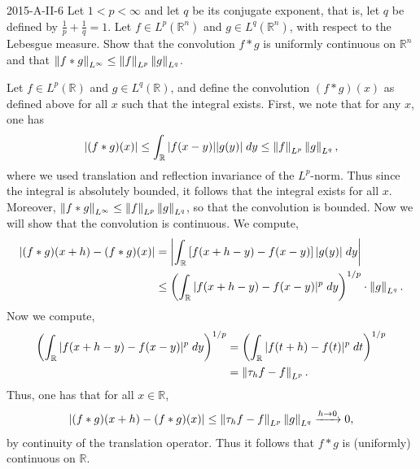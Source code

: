 \documentclass{article}
\begin{document}
	\begin{prb}{2015-A-II-6}
		Let $1 < p < \infty$ and let $q$ be its conjugate exponent, that is, let $q$ be defined by $\frac{1}{p} + \frac{1}{q} = 1$. Let $f \in L^p(\mathbb{R}^n)$ and $g \in L^q(\mathbb{R}^n)$, with respect to the Lebesgue measure. Show that the convolution $f \ast g$ is uniformly continuous on $\mathbb{R}^n$ and that $\left\Vert f \ast g \right\Vert_{L^\infty} \leq \left\Vert f \right\Vert_{L^p}\left\Vert g \right\Vert_{L^q}$. 
	\end{prb}
	Let $f \in L^p(\mathbb{R})$ and $g \in L^q(\mathbb{R})$, and define the convolution $(f \ast g)(x)$ as defined above for all $x$ such that the integral exists. First, we note that for any $x$, one has 
	\begin{equation*}
		\left| (f \ast g)(x) \right| \leq \int_{\mathbb{R}}|f(x-y)||g(y)|\;dy \leq \left\Vert f \right\Vert_{L^p}\left\Vert g \right\Vert_{L^q}, 
	\end{equation*}
	where we used translation and reflection invariance of the $L^p$-norm. Thus since the integral is absolutely bounded, it follows that the integral exists for all $x$. Moreover, $\left\Vert f \ast g \right\Vert_{L^\infty} \leq \left\Vert f \right\Vert_{L^p}\left\Vert g \right\Vert_{L^q}$, so that the convolution is bounded. Now we will show that the convolution is continuous. We compute, 
	\begin{align*}
		\begin{split}
			|(f \ast g)(x + h) - (f \ast g)(x)| &= \left| \int_{\mathbb{R}}\left[f(x + h - y) - f(x - y)\right]|g(y)|\;dy \right| \\
			&\leq \left(\int_{\mathbb{R}}|f(x + h - y) - f(x - y)|^{p}\;dy\right)^{1/p} \cdot \left\Vert g \right\Vert_{L^q}. 
		\end{split}
	\end{align*}
	Now we compute, 
	\begin{align*}
		\begin{split}
			\left(\int_{\mathbb{R}}|f(x + h - y) - f(x - y)|^{p}\;dy\right)^{1/p} &= \left(\int_{\mathbb{R}}|f(t + h) - f(t)|^p\;dt\right)^{1/p} \\
			&= \left\Vert \tau_hf - f \right\Vert_{L^p}. 
		\end{split}
	\end{align*}
	Thus, one has that for all $x \in \mathbb{R}$, 
	\begin{equation*}
		|(f \ast g)(x + h) - (f \ast g)(x)| \leq \left\Vert \tau_hf - f \right\Vert_{L^p}\left\Vert g \right\Vert_{L^q} \xrightarrow{h \to 0} 0, 
	\end{equation*}
	by continuity of the translation operator. Thus it follows that $f \ast g$ is (uniformly) continuous on $\mathbb{R}$. 
	
\end{document}

